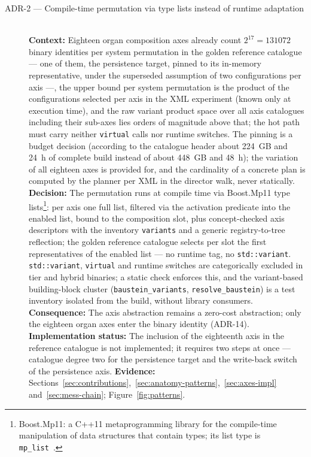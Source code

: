 \begin{description}
  \item[ADR-2 --- Compile-time permutation via type lists instead of runtime adaptation]\hfill\\
  \textbf{Context:} Eighteen organ composition axes already count $2^{17} = 131072$ binary
  identities per system permutation in the golden reference catalogue --- one of them, the persistence
  target, pinned to its in-memory representative, under the superseded assumption of two configurations per
  axis ---, the upper bound per system permutation is the product of the configurations selected per axis in
  the XML experiment (known only at execution time), and the raw variant product space over all axis
  catalogues including their sub-axes lies orders of magnitude above that; the hot
  path must carry neither \texttt{virtual} calls nor runtime switches. The pinning is a budget
  decision (according to the catalogue header about 224~GB and 24~h of complete build instead of
  about 448~GB and 48~h); the variation of all eighteen axes is provided for, and the cardinality of
  a concrete plan is computed by the planner per XML in the director walk, never statically.
  \textbf{Decision:} The permutation runs at compile time via Boost.Mp11 type
  lists\footnote{Boost.Mp11: a C++11 metaprogramming library for the compile-time manipulation of
  data structures that contain types; its list type is \texttt{mp\_list}~\cite{dimov_mp11}.}: per
  axis one full list, filtered via the activation predicate into the enabled list, bound to the
  composition slot, plus concept-checked axis descriptors with the inventory \texttt{variants} and a
  generic registry-to-tree reflection; the golden reference catalogue selects per slot the first
  representatives of the enabled list --- no runtime tag, no \texttt{std::variant}.
  \texttt{std::variant}, \texttt{virtual} and runtime switches are categorically excluded in tier
  and hybrid binaries; a static check enforces this, and the variant-based building-block cluster
  (\texttt{baustein\_variants}, \texttt{resolve\_baustein}) is a test inventory isolated from the
  build, without library consumers.
  \textbf{Consequence:} The axis abstraction remains a zero-cost abstraction; only the eighteen
  organ axes enter the binary identity (ADR-14).
  \textbf{Implementation status:} The inclusion of the eighteenth axis in the reference catalogue is
  not implemented; it requires two steps at once --- catalogue degree two for the persistence target
  and the write-back switch of the persistence axis.
  \textbf{Evidence:} Sections~\ref{sec:contributions},~\ref{sec:anatomy-patterns},~\ref{sec:axes-impl}
  and~\ref{sec:mess-chain}; Figure~\ref{fig:patterns}.


\end{description}
